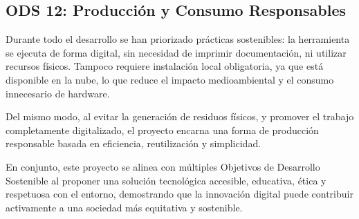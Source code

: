  

\subsection{ODS 12: Producción y Consumo Responsables}
Durante todo el desarrollo se han priorizado prácticas sostenibles: la herramienta se ejecuta de forma digital, sin necesidad de imprimir documentación, ni utilizar recursos físicos. Tampoco requiere instalación local obligatoria, ya que está disponible en la nube, lo que reduce el impacto medioambiental y el consumo innecesario de hardware.

Del mismo modo, al evitar la generación de residuos físicos, y promover el trabajo completamente digitalizado, el proyecto encarna una forma de producción responsable basada en eficiencia, reutilización y simplicidad.


 
En conjunto, este proyecto se alinea con múltiples Objetivos de Desarrollo Sostenible al proponer una solución tecnológica accesible, educativa, ética y respetuosa con el entorno, demostrando que la innovación digital puede contribuir activamente a una sociedad más equitativa y sostenible.
